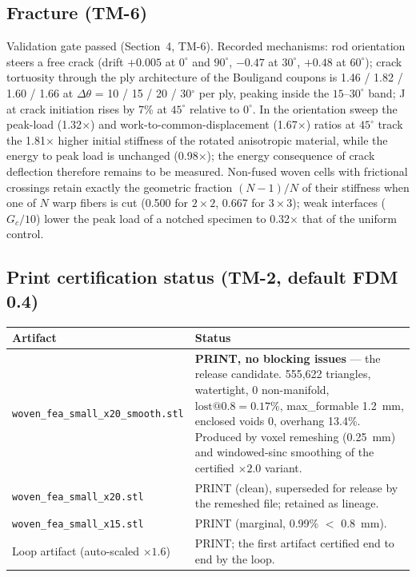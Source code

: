 \documentclass[11pt]{article}
\begin{document}
\subsection{Fracture (TM-6)}
Validation gate passed (Section~4, TM-6). Recorded mechanisms: rod orientation steers a free crack
(drift $+0.005$ at $0^\circ$ and $90^\circ$, $-0.47$ at $30^\circ$, $+0.48$ at $60^\circ$); crack
tortuosity through the ply architecture of the Bouligand coupons is 1.46 / 1.82 / 1.60 / 1.66 at
$\Delta\theta$ = 10 / 15 / 20 / 30$^\circ$ per ply, peaking inside the $15$--$30^\circ$ band; J at crack
initiation rises by 7\% at $45^\circ$ relative to $0^\circ$. In the orientation sweep the peak-load
(1.32$\times$) and work-to-common-displacement (1.67$\times$) ratios at $45^\circ$ track the
1.81$\times$ higher initial stiffness of the rotated anisotropic material, while the energy to peak load
is unchanged (0.98$\times$); the energy consequence of crack deflection therefore remains to be
measured. Non-fused woven cells with frictional crossings retain exactly the geometric fraction
$(N-1)/N$ of their stiffness when one of $N$ warp fibers is cut (0.500 for $2\times2$, 0.667 for
$3\times3$); weak interfaces ($G_c/10$) lower the peak load of a notched specimen to 0.32$\times$ that of
the uniform control.

\subsection{Print certification status (TM-2, default FDM 0.4)}
\begin{center}
\begin{tabularx}{\textwidth}{lL}
\toprule
Artifact & Status \\
\midrule
\texttt{woven\_fea\_small\_x20\_smooth.stl} &
\textbf{PRINT, no blocking issues} --- the release candidate. 555{,}622 triangles, watertight,
0 non-manifold, $\mathrm{lost}@0.8 = 0.17\%$, max\_formable 1.2~mm, enclosed voids 0, overhang 13.4\%.
Produced by voxel remeshing (0.25~mm) and windowed-sinc smoothing of the certified $\times 2.0$ variant. \\
\texttt{woven\_fea\_small\_x20.stl} & PRINT (clean), superseded for release by the remeshed file;
retained as lineage. \\
\texttt{woven\_fea\_small\_x15.stl} & PRINT (marginal, 0.99\% $<$ 0.8~mm). \\
Loop artifact (auto-scaled $\times 1.6$) & PRINT; the first artifact certified end to end by the loop. \\
\bottomrule
\end{tabularx}
\end{center}
\end{document}
